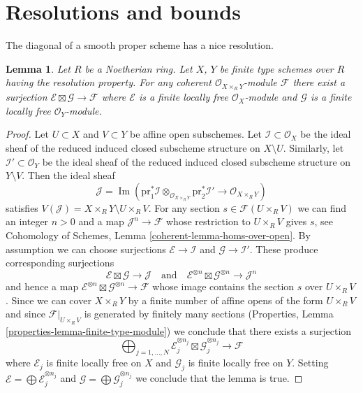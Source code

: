 \documentclass{stacks-project}
\theoremstyle{plain}
\newtheorem{lemma}[subsection]{Lemma}
\theoremstyle{definition}
\theoremstyle{remark}
\numberwithin{equation}{subsection}
\def\Im{\mathop{\mathrm{Im}}}
\begin{document}
\section{Resolutions and bounds}
\label{section-tricks-smooth}

\noindent
The diagonal of a smooth proper scheme has a nice resolution.

\begin{lemma}
\label{lemma-on-product}
Let $R$ be a Noetherian ring. Let $X$, $Y$ be finite type schemes over $R$
having the resolution property. For any coherent
$\mathcal{O}_{X \times_R Y}$-module $\mathcal{F}$ there exist
a surjection $\mathcal{E} \boxtimes \mathcal{G} \to \mathcal{F}$
where $\mathcal{E}$ is a finite locally free $\mathcal{O}_X$-module
and $\mathcal{G}$ is a finite locally free $\mathcal{O}_Y$-module.
\end{lemma}

\begin{proof}
Let $U \subset X$ and $V \subset Y$ be affine open subschemes. Let
$\mathcal{I} \subset \mathcal{O}_X$ be the ideal sheaf of the
reduced induced closed subscheme structure on $X \setminus U$.
Similarly, let $\mathcal{I}' \subset \mathcal{O}_Y$ be the ideal sheaf of the
reduced induced closed subscheme structure on $Y \setminus V$.
Then the ideal sheaf
$$
\mathcal{J} = \Im(\text{pr}_1^*\mathcal{I} \otimes_{\mathcal{O}_{X \times_R Y}}
\text{pr}_2^*\mathcal{I}' \to \mathcal{O}_{X \times_R Y})
$$
satisfies $V(\mathcal{J}) = X \times_R Y \setminus U \times_R V$.
For any section $s \in \mathcal{F}(U \times_R V)$ we can find an integer
$n > 0$ and a map $\mathcal{J}^n \to \mathcal{F}$ whose restriction to
$U \times_R V$ gives $s$, see
Cohomology of Schemes, Lemma \ref{coherent-lemma-homs-over-open}.
By assumption we can choose surjections
$\mathcal{E} \to \mathcal{I}$ and $\mathcal{G} \to \mathcal{I}'$.
These produce corresponding surjections
$$
\mathcal{E} \boxtimes \mathcal{G} \to \mathcal{J}
\quad\text{and}\quad
\mathcal{E}^{\otimes n} \boxtimes \mathcal{G}^{\otimes n} \to \mathcal{J}^n
$$
and hence a map
$\mathcal{E}^{\otimes n} \boxtimes \mathcal{G}^{\otimes n} \to \mathcal{F}$
whose image contains the section $s$ over $U \times_R V$.
Since we can cover $X \times_R Y$ by a finite number of affine opens
of the form $U \times_R V$ and since $\mathcal{F}|_{U \times_R V}$
is generated by finitely many sections (Properties, Lemma
\ref{properties-lemma-finite-type-module})
we conclude that there exists a surjection
$$
\bigoplus\nolimits_{j = 1, \ldots, N}
\mathcal{E}_j^{\otimes n_j} \boxtimes \mathcal{G}_j^{\otimes n_j}
\to \mathcal{F}
$$
where $\mathcal{E}_j$ is finite locally free on $X$ and
$\mathcal{G}_j$ is finite locally free on $Y$.
Setting $\mathcal{E} = \bigoplus \mathcal{E}_j^{\otimes n_j}$
and $\mathcal{G} = \bigoplus \mathcal{G}_j^{\otimes n_j}$
we conclude that the lemma is true.
\end{proof}
\end{document}
